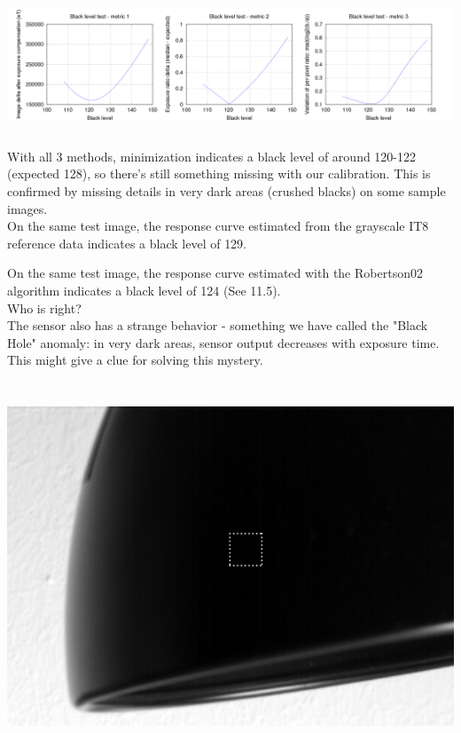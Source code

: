 \begin{center}
\includegraphics[height=4cm]{images/black_check}
\end{center}

With all 3 methods, minimization indicates a black level of around 120-122 (expected 128), so there's still something missing with our calibration. This is confirmed by missing details in very dark areas (crushed blacks) on some sample images.\\ 

On the same test image, the response curve estimated from the grayscale IT8 reference data indicates a black level of 129. 

On the same test image, the response curve estimated with the Robertson02 algorithm indicates a black level of 124 (See 11.5).\\

Who is right?\\

The sensor also has a strange behavior - something we have called the "Black Hole" anomaly: in very dark areas, sensor output decreases with exposure time. This might give a clue for solving this mystery.\\

\begin{center}
\includegraphics[height=11cm]{images/blackhole}
\end{center}





